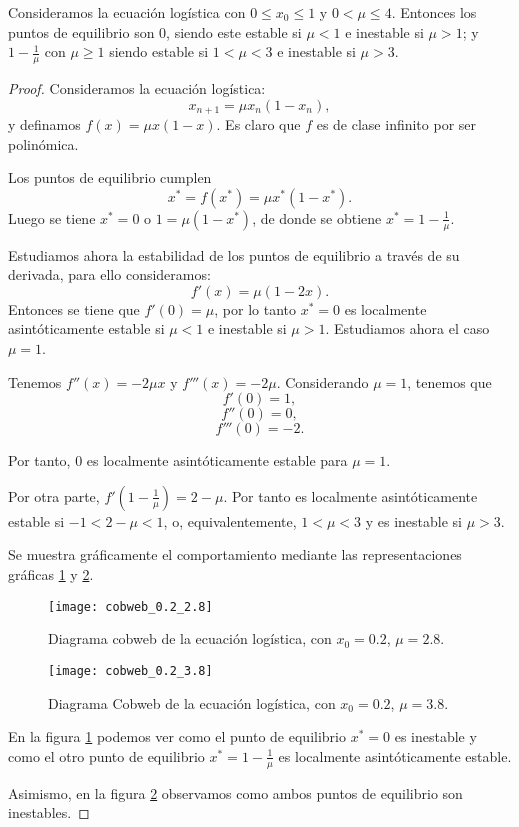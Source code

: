 \begin{proposition}
Consideramos la ecuación logística con $0\leq x_0\leq 1$ y $0< \mu\leq 4$. Entonces los puntos de equilibrio son $0$, siendo este estable si $\mu < 1$ e inestable si $\mu > 1$; y $1-\frac{1}{\mu}$ con $\mu\geq 1$ siendo estable si $1<\mu<3$ e inestable si $\mu > 3$.
\end{proposition}
\begin{proof}
Consideramos la ecuación logística:
$$x_{n+1} = \mu x_n(1-x_n),$$
y definamos $f(x)=\mu x(1-x)$. Es claro que $f$ es de clase infinito por ser polinómica.

Los puntos de equilibrio cumplen
$$x^*=f(x^*)=\mu x^*(1-x^*).$$
Luego se tiene $x^*=0$ o $1=\mu (1-x^*)$, de donde se obtiene $x^*=1-\frac{1}{\mu}$.

Estudiamos ahora la estabilidad de los puntos de equilibrio a través de su derivada, para ello consideramos:
$$f'(x)=\mu (1-2x).$$
Entonces se tiene que $f'(0)=\mu$, por lo tanto $x^*=0$ es localmente asintóticamente estable si $\mu < 1$ e inestable si $\mu > 1$. Estudiamos ahora el caso $\mu = 1$.

Tenemos $f''(x)=-2\mu x$ y $f'''(x)=-2\mu$. Considerando $\mu =1$, tenemos que
$$f'(0)=1,$$
$$f''(0)=0,$$
$$f'''(0)=-2.$$

Por tanto, $0$ es localmente asintóticamente estable para $\mu = 1$.

Por otra parte, $f'\left(1-\frac{1}{\mu}\right) = 2-\mu$. Por tanto es localmente asintóticamente estable si $-1<2-\mu<1$, o, equivalentemente, $1<\mu < 3$ y es inestable si $\mu > 3$.

Se muestra gráficamente el comportamiento mediante las representaciones gráficas \ref{fig: cobweb_2.8} y \ref{fig: cobweb_3.8}.

\begin{figure}
\begin{center}
\caption{Diagrama cobweb de la ecuación logística, con $x_0=0.2$, $\mu=2.8$.}
\label{fig: cobweb_2.8}
\texttt{[image: cobweb\_0.2\_2.8]}
\end{center}
\end{figure}

\begin{figure}
\begin{center}
\caption{Diagrama Cobweb de la ecuación logística, con $x_0=0.2$, $\mu=3.8$.}
\label{fig: cobweb_3.8}
\texttt{[image: cobweb\_0.2\_3.8]}
\end{center}
\end{figure}

En la figura \ref{fig: cobweb_2.8} podemos ver como el punto de equilibrio $x^*=0$ es inestable y como el otro punto de equilibrio $x^*=1-\frac{1}{\mu}$ es localmente asintóticamente estable.

Asimismo, en la figura \ref{fig: cobweb_3.8} observamos como ambos puntos de equilibrio son inestables.

\end{proof}

